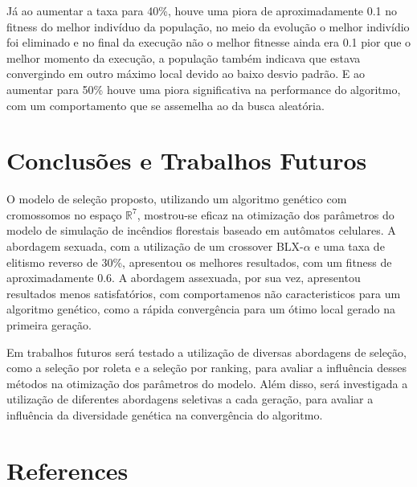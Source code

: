 \documentclass[12pt]{article}
\begin{document}
Já ao aumentar a taxa para 40\%, houve uma piora de aproximadamente 0.1 no fitness do melhor indivíduo da população, no meio da evolução o melhor indivídio foi eliminado e no final da execução não o melhor fitnesse ainda era 0.1 pior que o melhor momento da execução, a população também indicava que estava convergindo em outro máximo local devido ao baixo desvio padrão. E ao aumentar para 50\% houve uma piora significativa na performance do algoritmo, com um comportamento que se assemelha ao da busca aleatória.

\section{Conclusões e Trabalhos Futuros}

O modelo de seleção proposto, utilizando um algoritmo genético com cromossomos no espaço \(\mathbb{R}^7\), mostrou-se eficaz na otimização dos parâmetros do modelo de simulação de incêndios florestais baseado em autômatos celulares. A abordagem sexuada, com a utilização de um crossover BLX-$\alpha$ e uma taxa de elitismo reverso de 30\%, apresentou os melhores resultados, com um fitness de aproximadamente 0.6. A abordagem assexuada, por sua vez, apresentou resultados menos satisfatórios, com comportamenos não caracteristicos para um algoritmo genético, como a rápida convergência para um ótimo local gerado na primeira geração.

Em trabalhos futuros será testado a utilização de diversas abordagens de seleção, como a seleção por roleta e a seleção por ranking, para avaliar a influência desses métodos na otimização dos parâmetros do modelo. Além disso, será investigada a utilização de diferentes abordagens seletivas a cada geração, para avaliar a influência da diversidade genética na convergência do algoritmo.

\section{References}




\end{document}
